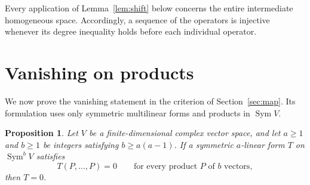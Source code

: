 \documentclass[11pt]{article}
\newtheorem{proposition}[theorem]{Proposition}
\theoremstyle{remark}
\DeclareMathOperator{\Sym}{Sym}
\begin{document}
Every application of Lemma~\ref{lem:shift} below concerns the entire
intermediate homogeneous space. Accordingly, a sequence of the operators
is injective whenever its degree inequality holds before each individual
operator.

\section{Vanishing on products}\label{sec:vanishing}

We now prove the vanishing statement in the criterion of
Section~\ref{sec:map}. Its formulation uses only symmetric multilinear
forms and products in $\Sym V$.

\begin{proposition}\label{prop:vanishing}
Let $V$ be a finite-dimensional complex vector space, and let $a\ge1$ and
$b\ge1$ be integers satisfying $b\ge a(a-1)$.
If a symmetric $a$-linear form $T$ on $\Sym^b V$ satisfies
\begin{equation}\label{eq:diagonal}
 T(P,\ldots,P)=0
 \qquad\text{for every product $P$ of $b$ vectors},
\end{equation}
then $T=0$.
\end{proposition}
\end{document}
